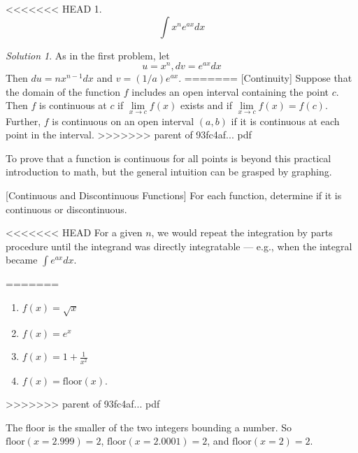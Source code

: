 \documentclass[]{book}
\providecommand{\tightlist}{%
  \setlength{\itemsep}{0pt}\setlength{\parskip}{0pt}}
\theoremstyle{definition}
\theoremstyle{definition}
\theoremstyle{definition}
\theoremstyle{remark}
\newtheorem*{solution}{Solution}
\begin{document}
<<<<<<< HEAD
1. \[\int x^n e^{ax} dx\]
\begin{solution}
{}
As in the first problem, let
\[u=x^n, dv=e^{ax}dx\]
Then \(du=n x^{n-1}dx\) and \(v=(1/a)e^{ax}\).
=======
[Continuity]
\protect\hypertarget{def:unnamed-chunk-7}{}{\label{def:unnamed-chunk-7} {} }Suppose that the domain of the function \(f\) includes an open interval containing the point \(c\). Then \(f\) is continuous at \(c\) if \(\lim\limits_{x \to c} f(x)\) exists and if \(\lim\limits_{x \to c} f(x)=f(c)\). Further, \(f\) is continuous on an open interval \((a,b)\) if it is continuous at each point in the interval.
>>>>>>> parent of 93fc4af... pdf

To prove that a function is continuous for all points is beyond this practical introduction to math, but the general intuition can be grasped by graphing.

[Continuous and Discontinuous Functions]
\protect\hypertarget{exm:contdiscont}{}{\label{exm:contdiscont} {} }
For each function, determine if it is continuous or discontinuous.

<<<<<<< HEAD
For a given \(n\), we would repeat the integration by parts procedure until the integrand was directly integratable --- e.g., when the integral became \(\int e^{ax}dx\).
\end{solution}
=======
\begin{enumerate}
\def\labelenumi{\arabic{enumi}.}
\tightlist
\item
  \(f(x) = \sqrt{x}\)
\item
  \(f(x) = e^x\)
\item
  \(f(x) = 1 + \frac{1}{x^2}\)
\item
  \(f(x) = \text{floor}(x)\).
\end{enumerate}
>>>>>>> parent of 93fc4af... pdf

The floor is the smaller of the two integers bounding a number. So \(\text{floor}(x = 2.999) = 2\), \(\text{floor}(x = 2.0001) = 2\), and \(\text{floor}(x = 2) = 2.\)
\end{document}
